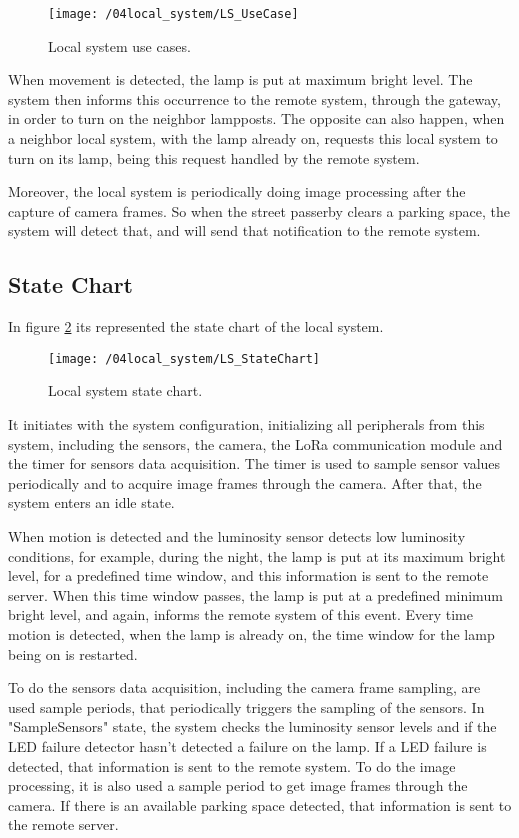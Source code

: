 \begin{figure}[ht] 
	\centering
	\texttt{[image: /04local\_system/LS\_UseCase]}
	\caption{Local system use cases.}
	\label{fig:ls_use_cases}
\end{figure}

When movement is detected, the lamp is put at maximum bright level. The system then informs this occurrence to the remote system, through the gateway, in order to turn on the neighbor lampposts. The opposite can also happen, when a neighbor local system, with the lamp already on, requests this local system to turn on its lamp, being this request handled by the remote system. 

Moreover, the local system is periodically doing image processing after the capture of camera frames. So when the street passerby clears a parking space, the system will detect that, and will send that notification to the remote system.

\clearpage
\subsection{State Chart}
In figure \ref{fig:ls_state_chart} its represented the state chart of the local system. 

\begin{figure}[H]
	\centering
	\texttt{[image: /04local\_system/LS\_StateChart]}
	\caption{Local system state chart.}
	\label{fig:ls_state_chart}
\end{figure}

It initiates with the system configuration, initializing all peripherals from this system, including the sensors, the camera, the LoRa communication module and the timer for sensors data acquisition. The timer is used to sample sensor values periodically and to acquire image frames through the camera. After that, the system enters an idle state.

When motion is detected and the luminosity sensor detects low luminosity conditions, for example, during the night, the lamp is put at its maximum bright level, for a predefined time window, and this information is sent to the remote server. When this time window passes, the lamp is put at a predefined minimum bright level, and again, informs the remote system of this event. Every time motion is detected, when the lamp is already on, the time window for the lamp being on is restarted.

To do the sensors data acquisition, including the camera frame sampling, are used sample periods, that periodically triggers the sampling of the sensors. In "SampleSensors" state, the system checks the luminosity sensor levels and if the LED failure detector hasn't detected a failure on the lamp. If a LED failure is detected, that information is sent to the remote system. To do the image processing, it is also used a sample period to get image frames through the camera. If there is an available parking space detected, that information is sent to the remote server.


